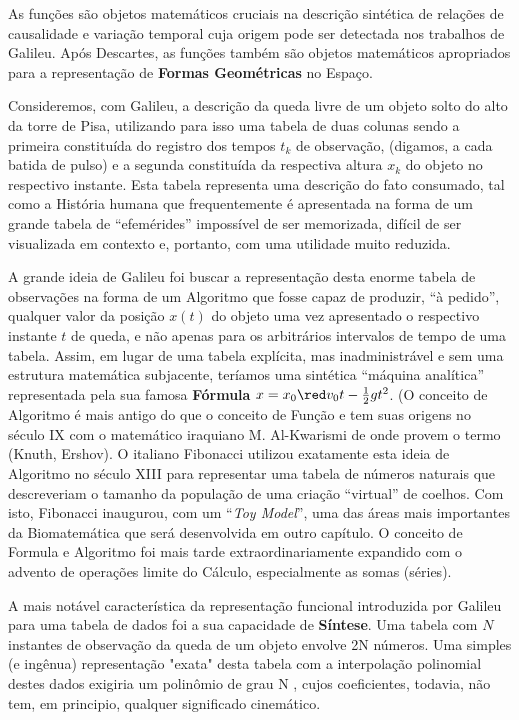     As funções são objetos matemáticos cruciais na descrição sintética de relações de causalidade e variação temporal cuja origem pode ser detectada nos trabalhos de Galileu. Após Descartes, as funções também são objetos matemáticos apropriados para a representação de \textbf{Formas Geométricas} no Espaço.

    Consideremos, com Galileu, a descrição da queda livre de um objeto solto do alto da torre de Pisa, utilizando para isso uma tabela de duas colunas sendo a primeira constituída do registro dos tempos \(t_k\) de observação, (digamos, a cada batida de pulso) e a segunda constituída da respectiva altura \(x_k\) do objeto no respectivo instante. Esta tabela representa uma descrição do fato consumado, tal como a História humana que frequentemente é apresentada na forma de um grande tabela de ``efemérides'' impossível de ser memorizada, difícil de ser visualizada em contexto e, portanto, com uma utilidade muito reduzida.

    A grande ideia de Galileu foi buscar a representação desta enorme tabela de observações na forma de um Algoritmo que fosse capaz de produzir, ``à pedido'', qualquer valor da posição \(x(t)\) do objeto uma vez apresentado o respectivo instante \(t\) de queda, e não apenas para os arbitrários intervalos de tempo de uma tabela. Assim, em lugar de uma tabela explícita, mas inadministrável e sem uma estrutura matemática subjacente, teríamos uma sintética ``máquina analítica'' representada pela sua famosa \textbf{Fórmula} \(x = x_0 {\red v_0t}- \frac{1}{2} gt^2\). (O conceito de Algoritmo é mais antigo do que o conceito de Função e tem suas origens no século IX com o matemático iraquiano M. Al-Kwarismi de onde provem o termo (Knuth, Ershov). O italiano Fibonacci utilizou exatamente esta ideia de Algoritmo no século XIII para representar uma tabela de números naturais que descreveriam o tamanho da população de uma criação ``virtual'' de coelhos. Com isto, Fibonacci inaugurou, com um ``\textit{Toy Model}'', uma das áreas mais importantes da Biomatemática que será desenvolvida em outro capítulo. O conceito de Formula e Algoritmo foi mais tarde extraordinariamente expandido com o advento de operações limite do Cálculo, especialmente as somas (séries).

    A mais notável característica da representação funcional introduzida por Galileu para uma tabela de dados foi a sua capacidade de \textbf{Síntese}. Uma tabela com \(N\) instantes de observação da queda de um objeto envolve 2N números. Uma simples (e ingênua) representação "exata" desta tabela com a interpolação polinomial destes dados exigiria um polinômio de grau N , cujos coeficientes, todavia, não tem, em principio, qualquer significado cinemático.

